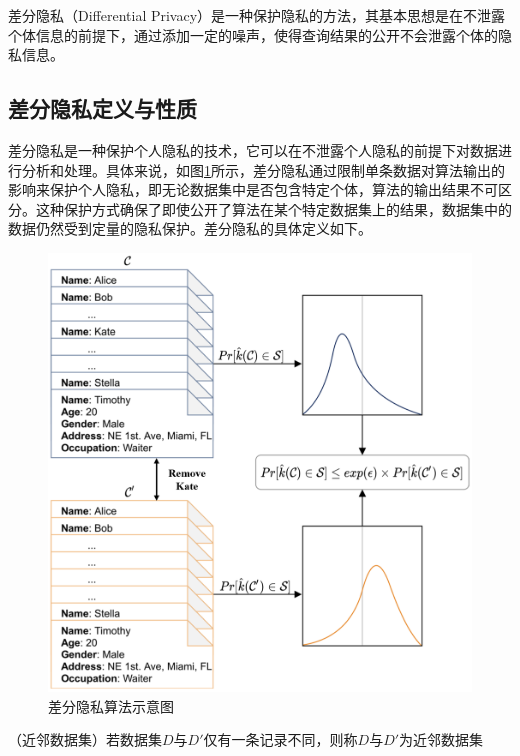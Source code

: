 差分隐私（Differential Privacy）\cite{DP}是一种保护隐私的方法，其基本思想是在不泄露个体信息的前提下，通过添加一定的噪声，使得查询结果的公开不会泄露个体的隐私信息。

\subsection{差分隐私定义与性质}


差分隐私是一种保护个人隐私的技术，它可以在不泄露个人隐私的前提下对数据进行分析和处理。具体来说，如图\ref{DP_demo}所示，差分隐私通过限制单条数据对算法输出的影响来保护个人隐私，即无论数据集中是否包含特定个体，算法的输出结果不可区分。这种保护方式确保了即使公开了算法在某个特定数据集上的结果，数据集中的数据仍然受到定量的隐私保护。差分隐私的具体定义如下。

\begin{figure}[h]
	\centering
	\includegraphics[width=0.8\linewidth]{figures/DP.png}
	\caption{差分隐私算法示意图}
	\label{DP_demo}
\end{figure}

\begin{definition}
	（近邻数据集\cite{dwork2006our}）若数据集$D$与$D'$仅有一条记录不同，则称$D$与$D'$为近邻数据集
\end{definition}



